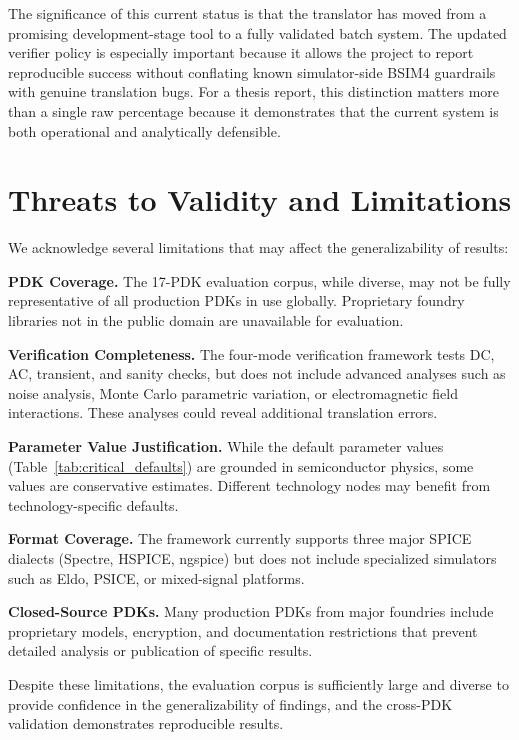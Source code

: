 \documentclass[10pt,twocolumn]{article}
\begin{document}
The significance of this current status is that the translator has moved from a promising development-stage tool to a fully validated batch system. The updated verifier policy is especially important because it allows the project to report reproducible success without conflating known simulator-side BSIM4 guardrails with genuine translation bugs. For a thesis report, this distinction matters more than a single raw percentage because it demonstrates that the current system is both operational and analytically defensible.

\section{Threats to Validity and Limitations}
\label{sec:threats}

We acknowledge several limitations that may affect the generalizability of results:

\textbf{PDK Coverage.} The 17-PDK evaluation corpus, while diverse, may not be fully representative of all production PDKs in use globally. Proprietary foundry libraries not in the public domain are unavailable for evaluation.

\textbf{Verification Completeness.} The four-mode verification framework tests DC, AC, transient, and sanity checks, but does not include advanced analyses such as noise analysis, Monte Carlo parametric variation, or electromagnetic field interactions. These analyses could reveal additional translation errors.

\textbf{Parameter Value Justification.} While the default parameter values (Table~\ref{tab:critical_defaults}) are grounded in semiconductor physics, some values are conservative estimates. Different technology nodes may benefit from technology-specific defaults.

\textbf{Format Coverage.} The framework currently supports three major SPICE dialects (Spectre, HSPICE, ngspice) but does not include specialized simulators such as Eldo, PSICE, or mixed-signal platforms.

\textbf{Closed-Source PDKs.} Many production PDKs from major foundries include proprietary models, encryption, and documentation restrictions that prevent detailed analysis or publication of specific results.

Despite these limitations, the evaluation corpus is sufficiently large and diverse to provide confidence in the generalizability of findings, and the cross-PDK validation demonstrates reproducible results.
\end{document}
